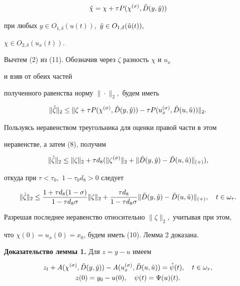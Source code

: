 \begin{equation} 


\Hat \chi =\chi +\tau P(\chi^{(\sigma)},\Tilde D(y,\Hat y)) 


\end{equation} 


при любых $y\in O_{1,\delta}(u(t)),$ $\Hat y\in O_{1,\delta}(\Hat u(t)),$ 


$\chi\in O_{2,\delta}(u_x(t)).$ 


 


Вычтем (2) из (11). Обозначив через $\zeta$ разность $\chi$ и $u_x$ 


и взяв от обеих частей 


полученного равенства норму $\|\cdot\|_2,$ будем иметь 


$$ 


\|\Hat \zeta\|_2 \le \|\zeta+\tau P(\chi^{(\sigma)}, 


\Tilde D(y,\Hat y))-\tau P(u_x^{(\sigma)},\Tilde D(u,\Hat u))\|_2. 


$$ 


Пользуясь неравенством треугольника для оценки правой части в этом 


неравенстве, а затем (8), получим 


$$ 


\|\Hat \zeta\|_2 \le \|\zeta\|_2 +\tau d_8 


(\|\zeta^{(\sigma)}\|_2+\|\Tilde D(y,\Hat y)-\Tilde D(u,\Hat u)\|_{(+)}),


$$ 


откуда при $\tau<\tau_0,$ $1-\tau_0d_8>0$ следует 


$$ 


\|\Hat \zeta\|_2 \le \frac{1+\tau d_8(1-\sigma)}{1-\tau d_8 \sigma} 


\|\zeta\|_2 +\frac{\tau d_8}{1-\tau d_8 \sigma} 


\|\Tilde D(y,\Hat y)-\Tilde D(u,\Hat u)\|_{(+)},\quad t\in \omega_\tau. 


$$ 


Разрешая последнее неравенство относительно $\|\zeta\|_2,$ учитывая при этом, 


что $\chi(0)=u_x(0)=x_0$, будем иметь (10). Лемма 2 доказана. 


 


{\bf Доказательство леммы 1.} Для $z=y-u$ имеем 


\begin{gather} 


z_t+A(\chi^{(\sigma)},\Tilde D(y,\Hat y))-A(u_x^{(\sigma)}, 


\Tilde D(u,\Hat u))=\Hat \psi(t),\quad t\in\omega_\tau,\\ 


z(0)=y_0-u(0),\quad \psi(t)=\Psi(u)(t).\notag 


\end{gather} 


